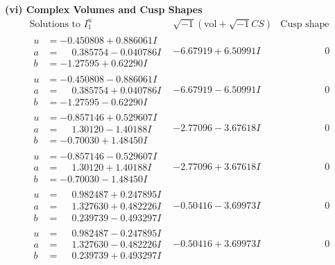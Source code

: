 \documentclass[1p]{elsarticle_modified}
\theoremstyle{definition}
\newcommand{\I}{\sqrt{-1}}
\begin{document}
\newpage\flushleft \textbf{(vi) Complex Volumes and Cusp Shapes}
$$\begin{array}{c|c|c}  
\text{Solutions to }I^u_{1}& \I (\text{vol} + \sqrt{-1}CS) & \text{Cusp shape}\\
 \hline 
\begin{aligned}
u &= -0.450808 + 0.886061 I \\
a &= \phantom{-}0.385754 - 0.040786 I \\
b &= -1.27595 + 0.62290 I\end{aligned}
 & -6.67919 + 6.50991 I & \phantom{-0.000000 } 0 \\ \hline\begin{aligned}
u &= -0.450808 - 0.886061 I \\
a &= \phantom{-}0.385754 + 0.040786 I \\
b &= -1.27595 - 0.62290 I\end{aligned}
 & -6.67919 - 6.50991 I & \phantom{-0.000000 } 0 \\ \hline\begin{aligned}
u &= -0.857146 + 0.529607 I \\
a &= \phantom{-}1.30120 - 1.40188 I \\
b &= -0.70030 + 1.48450 I\end{aligned}
 & -2.77096 - 3.67618 I & \phantom{-0.000000 } 0 \\ \hline\begin{aligned}
u &= -0.857146 - 0.529607 I \\
a &= \phantom{-}1.30120 + 1.40188 I \\
b &= -0.70030 - 1.48450 I\end{aligned}
 & -2.77096 + 3.67618 I & \phantom{-0.000000 } 0 \\ \hline\begin{aligned}
u &= \phantom{-}0.982487 + 0.247895 I \\
a &= \phantom{-}1.327630 + 0.482226 I \\
b &= \phantom{-}0.239739 - 0.493297 I\end{aligned}
 & -0.50416 - 3.69973 I & \phantom{-0.000000 } 0 \\ \hline\begin{aligned}
u &= \phantom{-}0.982487 - 0.247895 I \\
a &= \phantom{-}1.327630 - 0.482226 I \\
b &= \phantom{-}0.239739 + 0.493297 I\end{aligned}
 & -0.50416 + 3.69973 I & \phantom{-0.000000 } 0 \\ \hline\begin{aligned}

\end{aligned}
\end{array}$$
\end{document}
